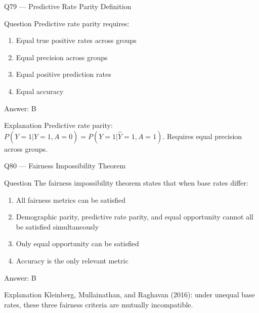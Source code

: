 \documentclass[aspectratio=169,8pt]{beamer}
\begin{document}
	\begin{frame}{Q79 --- Predictive Rate Parity Definition}
		\begin{block}{Question}
			Predictive rate parity requires:
			\begin{enumerate}
				\item Equal true positive rates across groups
				\item Equal precision across groups
				\item Equal positive prediction rates
				\item Equal accuracy
			\end{enumerate}
		\end{block}
		\begin{exampleblock}{Answer: B}\end{exampleblock}
		\begin{block}{Explanation}
			Predictive rate parity: $P(Y=1 | \hat{Y}=1, A=0) = P(Y=1 | \hat{Y}=1, A=1)$. Requires equal precision across groups.
		\end{block}
	\end{frame}
	
	\begin{frame}{Q80 --- Fairness Impossibility Theorem}
		\begin{block}{Question}
			The fairness impossibility theorem states that when base rates differ:
			\begin{enumerate}
				\item All fairness metrics can be satisfied
				\item Demographic parity, predictive rate parity, and equal opportunity cannot all be satisfied simultaneously
				\item Only equal opportunity can be satisfied
				\item Accuracy is the only relevant metric
			\end{enumerate}
		\end{block}
		\begin{exampleblock}{Answer: B}\end{exampleblock}
		\begin{block}{Explanation}
			Kleinberg, Mullainathan, and Raghavan (2016): under unequal base rates, these three fairness criteria are mutually incompatible.
		\end{block}
	\end{frame}
	
\end{document}
